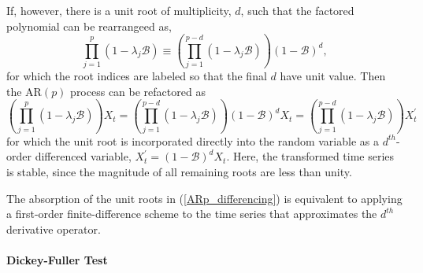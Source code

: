 \documentclass[12pt, twoside, draft]{article}
\begin{document}
If, however, there is a unit root of multiplicity, $d$, such that the factored polynomial can be rearrangeed as,
\begin{equation}
 \prod_{j=1}^p \left( 1 - \lambda_j \mathcal{B} \right) \equiv  \left( \prod_{j=1}^{p - d} \left( 1 - \lambda_j \mathcal{B} \right) \right) \left( 1 - \mathcal{B} \right)^d,
\end{equation}
for which the root indices are labeled so that the final $d$ have unit value.  Then the AR$(p)$ process can be refactored as
\begin{equation}\label{ARp_differencing}
 \left( \prod_{j=1}^p \left( 1 - \lambda_j \mathcal{B} \right) \right) X_t = \left( \prod_{j=1}^{p - d} \left( 1 - \lambda_j \mathcal{B} \right) \right) ( 1 - \mathcal{B} )^d X_t = \left( \prod_{j=1}^{p - d} \left( 1 - \lambda_j \mathcal{B} \right) \right) X^{'}_t
\end{equation}
for which the unit root is incorporated directly into the random variable as a $d^{th}$-order differenced variable, $X^{'}_t =  ( 1 - \mathcal{B} )^d X_t$.  Here, the transformed time series is stable, since the magnitude of all remaining roots are less than unity.

 The absorption of the unit roots in (\ref{ARp_differencing}) is equivalent to applying a first-order finite-difference scheme to the time series that approximates the $d^{th}$ derivative operator.


\paragraph {Dickey-Fuller Test}
\end{document}

